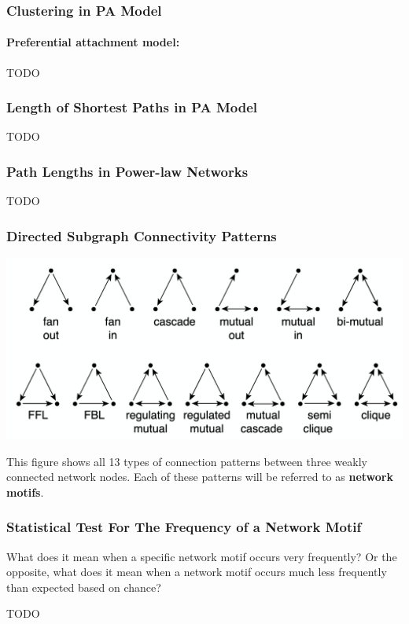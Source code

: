 \documentclass[11pt]{scrartcl} %
\begin{document}
\subsubsection{Clustering in PA Model}
\paragraph{Preferential attachment model:}

TODO

\subsubsection{Length of Shortest Paths in PA Model}
TODO

\subsubsection{Path Lengths in Power-law Networks}
TODO

\subsubsection{Directed Subgraph Connectivity Patterns}
	\begin{center}
		\includegraphics[width=0.75\linewidth]{img/L5.2-DirectedSubgraphConnectivity.PNG}
	\end{center}
This figure shows all 13 types of connection patterns between three weakly connected network nodes. Each of these patterns will be referred to as \textbf{network motifs}.

\subsubsection{Statistical Test For The Frequency of a Network Motif}
What does it mean when a specific network motif occurs very frequently? Or the opposite, what does it mean when a network motif occurs much less frequently than expected based on chance?

TODO
\end{document}
